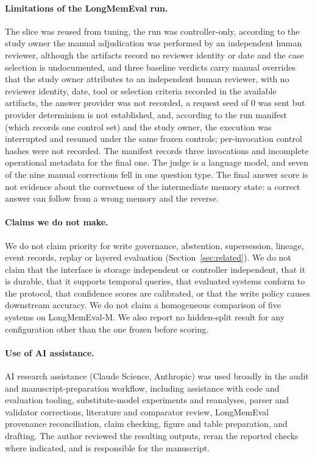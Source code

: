 \paragraph{Limitations of the LongMemEval run.} The slice was reused from tuning, the run was controller-only, according to the study owner the manual adjudication was performed by an independent human reviewer, although the artifacts record no reviewer identity or date and the case selection is undocumented, and three baseline verdicts carry manual overrides that the study owner attributes to an independent human reviewer, with no reviewer identity, date, tool or selection criteria recorded in the available artifacts, the answer provider was not recorded, a request seed of 0 was sent but provider determinism is not established, and, according to the run manifest (which records one control set) and the study owner, the execution was interrupted and resumed under the same frozen controls; per-invocation control hashes were not recorded. The manifest records three invocations and incomplete operational metadata for the final one. The judge is a language model, and seven of the nine manual corrections fell in one question type. The final answer score is not evidence about the correctness of the intermediate memory state: a correct answer can follow from a wrong memory and the reverse.

\paragraph{Claims we do not make.} We do not claim priority for write governance, abstention, supersession, lineage, event records, replay or layered evaluation (Section~\ref{sec:related}). We do not claim that the interface is storage independent or controller independent, that it is durable, that it supports temporal queries, that evaluated systems conform to the protocol, that confidence scores are calibrated, or that the write policy causes downstream accuracy. We do not claim a homogeneous comparison of five systems on LongMemEval-M. We also report no hidden-split result for any configuration other than the one frozen before scoring.

\paragraph{Use of AI assistance.} AI research assistance (Claude Science, Anthropic) was used broadly in the audit and manuscript-preparation workflow, including assistance with code and evaluation tooling, substitute-model experiments and reanalyses, parser and validator corrections, literature and comparator review, LongMemEval provenance reconciliation, claim checking, figure and table preparation, and drafting. The author reviewed the resulting outputs, reran the reported checks where indicated, and is responsible for the manuscript.

